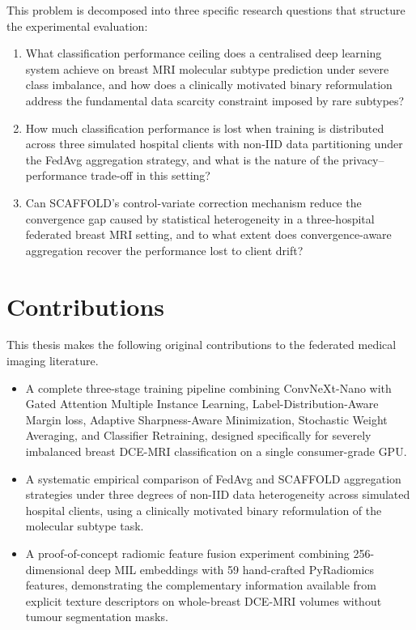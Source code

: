 This problem is decomposed into three specific research
questions that structure the experimental evaluation:

\begin{enumerate}

  \item What classification performance ceiling does a
  centralised deep learning system achieve on breast MRI
  molecular subtype prediction under severe class
  imbalance, and how does a clinically motivated binary
  reformulation address the fundamental data scarcity
  constraint imposed by rare subtypes?

  \item How much classification performance is lost when
  training is distributed across three simulated hospital
  clients with non-IID data partitioning under the FedAvg
  aggregation strategy, and what is the nature of the
  privacy--performance trade-off in this setting?

  \item Can SCAFFOLD's control-variate correction
  mechanism reduce the convergence gap caused by
  statistical heterogeneity in a three-hospital federated
  breast MRI setting, and to what extent does
  convergence-aware aggregation recover the performance
  lost to client drift?

\end{enumerate}

\section*{Contributions}

This thesis makes the following original contributions
to the federated medical imaging literature.

\begin{itemize}

  \item A complete three-stage training pipeline combining
  ConvNeXt-Nano with Gated Attention Multiple Instance
  Learning, Label-Distribution-Aware Margin loss, Adaptive
  Sharpness-Aware Minimization, Stochastic Weight
  Averaging, and Classifier Retraining, designed
  specifically for severely imbalanced breast DCE-MRI
  classification on a single consumer-grade GPU.

  \item A systematic empirical comparison of FedAvg and
  SCAFFOLD aggregation strategies under three degrees of
  non-IID data heterogeneity across simulated hospital
  clients, using a clinically motivated binary
  reformulation of the molecular subtype task.

  \item A proof-of-concept radiomic feature fusion
  experiment combining 256-dimensional deep MIL embeddings
  with 59 hand-crafted PyRadiomics features, demonstrating
  the complementary information available from explicit
  texture descriptors on whole-breast DCE-MRI volumes
  without tumour segmentation masks.

\end{itemize}

